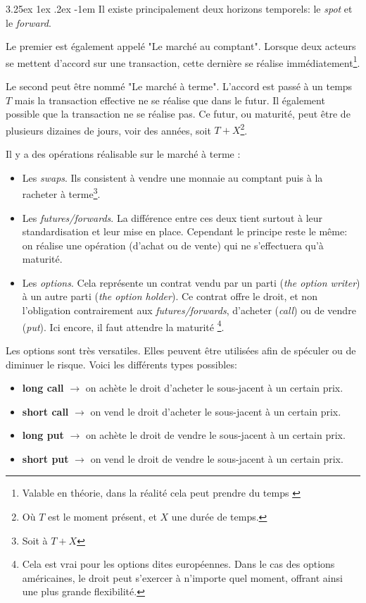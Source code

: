 \documentclass[a4paper, 11pt]{article}
\makeatletter
\renewcommand\paragraph{\@startsection{paragraph}{5}{\z@}%
  {3.25ex \@plus1ex \@minus.2ex}%
  {-1em}%
  {\normalfont\normalsize\bfseries}}
\makeatother
\begin{document}
\paragraph{}
Il existe principalement deux horizons temporels: le \textit{spot} et le \textit{forward}.

Le premier est également appelé "Le marché au comptant". Lorsque deux acteurs se mettent d'accord sur une transaction,
cette dernière se réalise 
immédiatement\footnote{Valable en théorie, dans la réalité cela peut prendre du temps \cite{marche_des_changes}}.

Le second peut être nommé "Le marché à terme". L'accord est passé à un temps $T$ mais la transaction effective ne
se réalise que dans le futur. Il également possible que la transaction ne se réalise pas. Ce futur, ou maturité, peut être de plusieurs dizaines de jours,
voir des années, soit $T + X$\footnote{Où $T$ est le moment présent, et $X$ une durée de temps.}.

Il y a des opérations réalisable sur le marché à terme :
\begin{itemize}
\item Les \textit{swaps}. Ils consistent à vendre une monnaie au comptant puis à la racheter à terme\footnote{Soit à $T+X$}.

\item Les \textit{futures/forwards}. La différence entre ces deux tient surtout à leur standardisation et leur mise en place.
Cependant le principe reste le même: on réalise une opération (d'achat ou de vente) qui ne s'effectuera qu'à maturité.

\item Les \textit{options}. Cela représente un contrat vendu par un parti (\textit{the option writer}) 
à un autre parti (\textit{the option holder}). Ce contrat offre le droit, et non l'obligation contrairement 
aux \textit{futures/forwards}, d'acheter (\textit{call}) ou de vendre (\textit{put}). Ici encore, il faut attendre la maturité
\footnote{Cela est vrai pour les options dites européennes\cite{investopedia_option_europeenne}. 
Dans le cas des options américaines\cite{investopedia_option_americaine}, le droit peut s'exercer à n'importe quel moment, offrant
ainsi une plus grande flexibilité.}.
\end{itemize}

Les options sont très versatiles. Elles peuvent être utilisées afin de spéculer ou de diminuer le risque. Voici les différents types possibles:
\begin{itemize}
\item \textbf{long call} $\rightarrow$ on achète le droit d'acheter le sous-jacent à un certain prix.
\item \textbf{short call} $\rightarrow$ on vend le droit d'acheter le sous-jacent à un certain prix.
\item \textbf{long put} $\rightarrow$ on achète le droit de vendre le sous-jacent à un certain prix.
\item \textbf{short put} $\rightarrow$ on vend le droit de vendre le sous-jacent à un certain prix.
\end{itemize}
\end{document}
